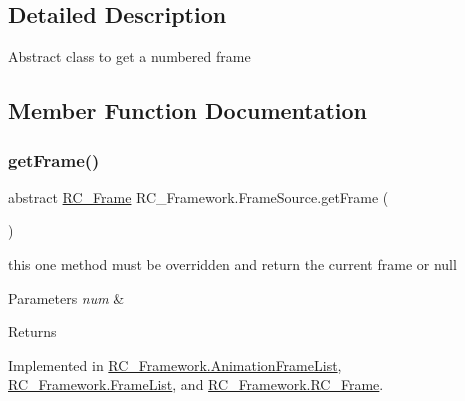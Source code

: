 \subsection{Detailed Description}
Abstract class to get a numbered frame 



\subsection{Member Function Documentation}
\mbox{\label{class_r_c___framework_1_1_frame_source_a6fd84a8d608da7d9ff2ff5ab10ed4243}} 
\subsubsection{\texorpdfstring{get\+Frame()}{getFrame()}\hspace{0.1cm}{\footnotesize\ttfamily [1/2]}}
{\footnotesize\ttfamily abstract \mbox{\hyperlink{class_r_c___framework_1_1_r_c___frame}{R\+C\+\_\+\+Frame}} R\+C\+\_\+\+Framework.\+Frame\+Source.\+get\+Frame (\begin{DoxyParamCaption}{ }\end{DoxyParamCaption})\hspace{0.3cm}{\ttfamily [pure virtual]}}



this one method must be overridden and return the current frame or null 


\begin{DoxyParams}{Parameters}
{\em num} & \\
\hline
\end{DoxyParams}
\begin{DoxyReturn}{Returns}

\end{DoxyReturn}


Implemented in \mbox{\hyperlink{class_r_c___framework_1_1_animation_frame_list_a5bc162ddb15e2ef4f98b72be2720a87b}{R\+C\+\_\+\+Framework.\+Animation\+Frame\+List}}, \mbox{\hyperlink{class_r_c___framework_1_1_frame_list_ab91faad4e97b6e118d1b49d267d15b34}{R\+C\+\_\+\+Framework.\+Frame\+List}}, and \mbox{\hyperlink{class_r_c___framework_1_1_r_c___frame_a9262ade99ade9dc102aac56587d55d0f}{R\+C\+\_\+\+Framework.\+R\+C\+\_\+\+Frame}}.

